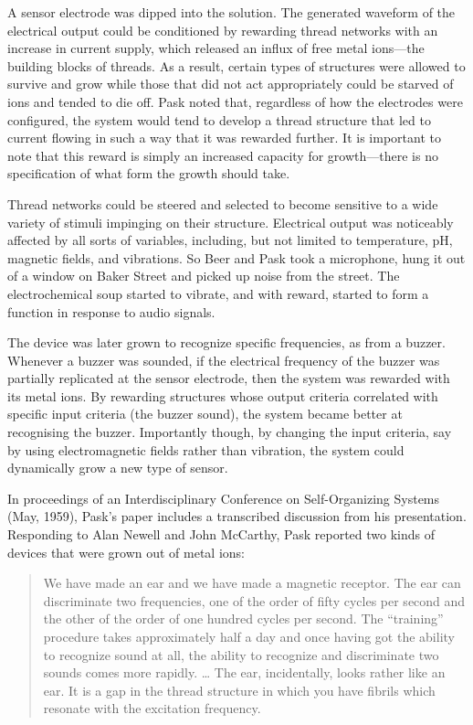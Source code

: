 A sensor electrode was dipped into the solution.
The generated waveform of the electrical output could be conditioned by rewarding thread networks with an increase in current supply, which released an influx of free metal ions---the building blocks of threads.
As a result, certain types of structures were allowed to survive and grow while those that did not act appropriately could be
starved of ions and tended to die off. 
Pask noted that, regardless of how the electrodes were configured, the system would tend to develop a thread structure that led to current flowing in such a way that it was rewarded further.
It is important to note that this reward is simply an increased capacity for growth---there is no specification of what form the growth should take. 

Thread networks could be steered and selected to become sensitive to a wide variety of stimuli impinging on their structure.
Electrical output was noticeably affected by all sorts of variables, including, but not limited to temperature, pH, magnetic fields, and vibrations.
So Beer and Pask took a microphone, 
hung it out of a window on Baker Street
and picked up noise from the street.
The electrochemical soup started to vibrate, and with reward, started to form a function in response to audio signals.

The device was later grown to recognize specific frequencies, as from a buzzer.
Whenever a buzzer was sounded,
if the electrical frequency of the buzzer was partially replicated at the sensor electrode, 
then the system was rewarded with its metal ions. 
By rewarding structures whose
output criteria correlated with specific input criteria (the buzzer sound), the system became better at recognising the buzzer.
Importantly though, by changing the input criteria, say by using electromagnetic fields rather than vibration, the system could dynamically grow a new type of sensor.

In proceedings of an Interdisciplinary Conference on Self-Organizing Systems 
(May, 1959),
Pask's paper \cite{pask1960natural} includes a transcribed discussion from his presentation.
Responding to Alan Newell and John McCarthy, Pask reported two kinds of devices that were grown out of metal ions:
\begin{quote}
\small
We have made an ear and we have made a magnetic receptor. The
ear can discriminate two frequencies, one of the order of fifty cycles per second and the other of the order of one hundred cycles per second. 
The ``training'' procedure takes approximately half a day and once having got the ability to recognize sound at all, the ability to recognize and discriminate two sounds comes more rapidly. 
\dots
The ear, incidentally, looks rather like an ear. It is a gap in the thread structure in which you have fibrils which resonate with the excitation frequency.
\end{quote}


